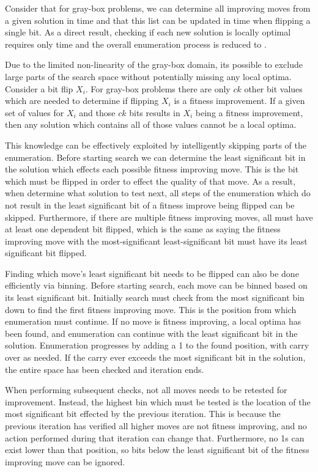 Consider that for gray-box problems, we can determine all improving moves from a given
solution in  time and that this list can be updated in  time when flipping
a single bit. As a direct result, checking if each new solution is locally optimal requires
only  time and the overall enumeration process is reduced to .

Due to the limited non-linearity of the gray-box domain, its possible to exclude large
parts of the search space without potentially missing any local optima. Consider a bit flip $X_i$.
For gray-box problems there are only $ck$ other bit values which are needed to determine if flipping
$X_i$ is a fitness improvement. If a given set of values for $X_i$ and those $ck$ bits results in
$X_i$ being a fitness improvement, then any solution which contains all of those values cannot be a local optima.

This knowledge can be effectively exploited by intelligently skipping parts of the enumeration.
Before starting search we can determine the least significant bit in the solution which effects
each possible fitness improving move. This is the bit which must be flipped in order to effect
the quality of that move. As a result, when determine what solution to test next, all steps
of the enumeration which do not result in the least significant bit of a fitness improve being
flipped can be skipped. Furthermore, if there are multiple fitness improving moves, all must
have at least one dependent bit flipped, which is the same as saying the fitness improving move
with the most-significant least-significant bit must have its least significant bit flipped.


Finding which move's least significant bit needs to be flipped can also be done efficiently via binning.
Before starting search, each move can be binned based on its least significant bit. Initially
search must check from the most significant bin down to find the first fitness improving move.
This is the position from which enumeration must continue. If no move is fitness improving, a local
optima has been found, and enumeration can continue with the least significant bit in the solution.
Enumeration progresses by adding a 1 to the found position, with carry over as needed.
If the carry ever exceeds the most significant bit in the solution, the entire space has been checked and iteration ends.

When performing subsequent checks, not all moves needs to be retested for improvement. Instead, the highest
bin which must be tested is the location of the most significant bit effected by the previous iteration. This is because
the previous iteration has verified all higher moves are not fitness improving, and no action performed during
that iteration can change that. Furthermore, no 1s can exist lower than that position, so bits
below the least significant bit of the fitness improving move can be ignored.


